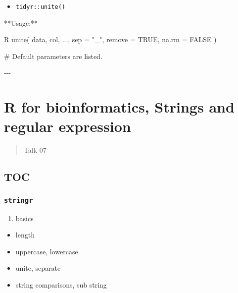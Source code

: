 \documentclass[
]{article}
\newenvironment{Shaded}{}{}
\newcommand{\NormalTok}[1]{#1}
\begin{document}
\begin{itemize}
\item
  \texttt{tidyr::unite()}
\end{itemize}

\begin{Shaded}
\begin{Highlighting}[]
\NormalTok{**Usage:**}

\NormalTok{\textasciigrave{}\textasciigrave{}\textasciigrave{}R}
\NormalTok{unite(}
\NormalTok{  data,}
\NormalTok{  col, }
\NormalTok{  ..., }
\NormalTok{  sep = "\_", }
\NormalTok{  remove = TRUE, }
\NormalTok{  na.rm = FALSE}
\NormalTok{)}

\NormalTok{\# Default parameters are listed.}
\NormalTok{\textasciigrave{}\textasciigrave{}\textasciigrave{}}

\NormalTok{{-}{-}{-}}
\end{Highlighting}
\end{Shaded}

\hypertarget{r-for-bioinformatics-strings-and-regular-expression}{%
\section{R for bioinformatics, Strings and regular
expression}\label{r-for-bioinformatics-strings-and-regular-expression}}

\begin{quote}
Talk 07
\end{quote}

\hypertarget{toc-3}{%
\subsection{TOC}\label{toc-3}}

\hypertarget{stringr}{%
\subsubsection{\texorpdfstring{\texttt{stringr}}{stringr}}\label{stringr}}

\begin{enumerate}
\def\labelenumi{\arabic{enumi}.}
\item
  basics
\end{enumerate}

\begin{itemize}
\item
  length
\item
  uppercase, lowercase
\item
  unite, separate
\item
  string comparisons, sub string
\end{itemize}
\end{document}
